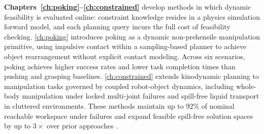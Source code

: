 



\textbf{Chapters~\ref{ch:poking}--\ref{ch:constrained}} develop methods in which dynamic feasibility is evaluated online: constraint knowledge resides in a physics simulation forward model, and each planning query incurs the full cost of feasibility checking.
\cref{ch:poking} introduces poking as a dynamic non-prehensile manipulation primitive, using impulsive contact within a sampling-based planner to achieve object rearrangement without explicit contact modeling. Across six scenarios, poking achieves higher success rates and lower task completion times than pushing and grasping baselines.
\cref{ch:constrained} extends kinodynamic planning to manipulation tasks governed by coupled robot-object dynamics, including whole-body manipulation under locked multi-joint failures and spill-free liquid transport in cluttered environments. These methods maintain up to 92\% of nominal reachable workspace under failures and expand feasible spill-free solution spaces by up to $3\times$ over prior approaches .

